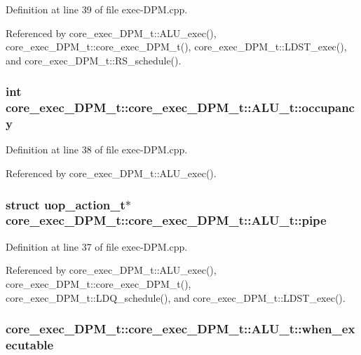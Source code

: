 Definition at line 39 of file exec-DPM.cpp.

Referenced by core\_\-exec\_\-DPM\_\-t::ALU\_\-exec(), core\_\-exec\_\-DPM\_\-t::core\_\-exec\_\-DPM\_\-t(), core\_\-exec\_\-DPM\_\-t::LDST\_\-exec(), and core\_\-exec\_\-DPM\_\-t::RS\_\-schedule().
\subsubsection[{occupancy}]{\setlength{\rightskip}{0pt plus 5cm}int core\_\-exec\_\-DPM\_\-t::core\_\-exec\_\-DPM\_\-t::ALU\_\-t::occupancy}\label{structcore__exec__DPM__t_1_1ALU__t_048592627a2d37afb4cc0c20d0910cd8}




Definition at line 38 of file exec-DPM.cpp.

Referenced by core\_\-exec\_\-DPM\_\-t::ALU\_\-exec().
\subsubsection[{pipe}]{\setlength{\rightskip}{0pt plus 5cm}struct {\bf uop\_\-action\_\-t}$\ast$ core\_\-exec\_\-DPM\_\-t::core\_\-exec\_\-DPM\_\-t::ALU\_\-t::pipe\hspace{0.3cm}{\tt  [read]}}\label{structcore__exec__DPM__t_1_1ALU__t_0a7a0d77edc0b1e9014ce573ea157ae5}




Definition at line 37 of file exec-DPM.cpp.

Referenced by core\_\-exec\_\-DPM\_\-t::ALU\_\-exec(), core\_\-exec\_\-DPM\_\-t::core\_\-exec\_\-DPM\_\-t(), core\_\-exec\_\-DPM\_\-t::LDQ\_\-schedule(), and core\_\-exec\_\-DPM\_\-t::LDST\_\-exec().
\subsubsection[{when\_\-executable}]{ core\_\-exec\_\-DPM\_\-t::core\_\-exec\_\-DPM\_\-t::ALU\_\-t::when\_\-executable}\label{structcore__exec__DPM__t_1_1ALU__t_48cab98e064f120d1679f120f852518c}




